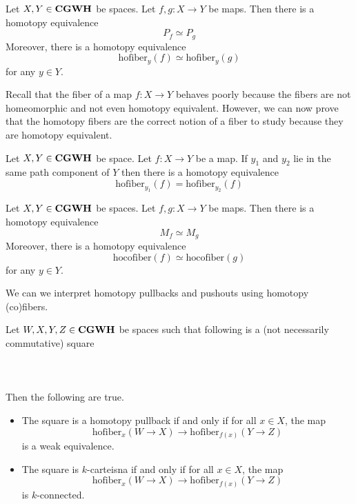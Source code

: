 \documentclass[a4paper]{article}
\begin{document}
\begin{crl}{}{} Let $X,Y\in\bold{CGWH}$ be spaces. Let $f,g:X\to Y$ be maps. Then there is a homotopy equivalence $$P_f\simeq P_g$$ Moreover, there is a homotopy equivalence $$\text{hofiber}_y(f)\simeq\text{hofiber}_y(g)$$ for any $y\in Y$. 
\end{crl}

Recall that the fiber of a map $f:X\to Y$ behaves poorly because the fibers are not homeomorphic and not even homotopy equivalent. However, we can now prove that the homotopy fibers are the correct notion of a fiber to study because they are homotopy equivalent. 

\begin{crl}{}{} Let $X,Y\in\bold{CGWH}$ be space. Let $f:X\to Y$ be a map. If $y_1$ and $y_2$ lie in the same path component of $Y$ then there is a homotopy equivalence $$\text{hofiber}_{y_1}(f)=\text{hofiber}_{y_2}(f)$$
\end{crl}

\begin{crl}{}{} Let $X,Y\in\bold{CGWH}$ be spaces. Let $f,g:X\to Y$ be maps. Then there is a homotopy equivalence $$M_f\simeq M_g$$ Moreover, there is a homotopy equivalence $$\text{hocofiber}(f)\simeq\text{hocofiber}(g)$$ for any $y\in Y$. 
\end{crl}

We can we interpret homotopy pullbacks and pushouts using homotopy (co)fibers. 

\begin{prp}{}{} Let $W,X,Y,Z\in\bold{CGWH}$ be spaces such that following is a (not necessarily commutative) square \\~\\
\\~\\
Then the following are true. 
\begin{itemize}
\item The square is a homotopy pullback if and only if for all $x\in X$, the map $$\text{hofiber}_x(W\to X)\to\text{hofiber}_{f(x)}(Y\to Z)$$ is a weak equivalence. 
\item The square is $k$-carteisna if and only if for all $x\in X$, the map $$\text{hofiber}_x(W\to X)\to\text{hofiber}_{f(x)}(Y\to Z)$$ is $k$-connected. 
\end{itemize}
\end{prp}
\end{document}
